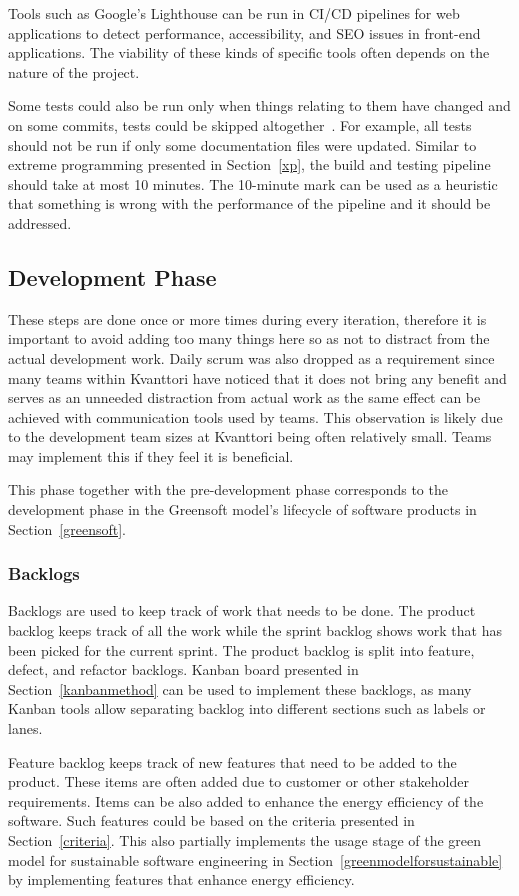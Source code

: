Tools such as Google's Lighthouse can be run in CI/CD pipelines for web applications to detect performance, accessibility, and SEO issues in front-end applications. The viability of these kinds of specific tools often depends on the nature of the project.

Some tests could also be run only when things relating to them have changed and on some commits, tests could be skipped altogether~\cite{skippedcommits}. For example, all tests should not be run if only some documentation files were updated. Similar to extreme programming presented in Section~\ref{xp}, the build and testing pipeline should take at most 10 minutes. The 10-minute mark can be used as a heuristic that something is wrong with the performance of the pipeline and it should be addressed.

\subsection{Development Phase}
These steps are done once or more times during every iteration, therefore it is important to avoid adding too many things here so as not to distract from the actual development work. Daily scrum was also dropped as a requirement since many teams within Kvanttori have noticed that it does not bring any benefit and serves as an unneeded distraction from actual work as the same effect can be achieved with communication tools used by teams. This observation is likely due to the development team sizes at Kvanttori being often relatively small. Teams may implement this if they feel it is beneficial.

This phase together with the pre-development phase corresponds to the development phase in the Greensoft model's lifecycle of software products in Section~\ref{greensoft}.

\subsubsection{Backlogs}
Backlogs are used to keep track of work that needs to be done. The product backlog keeps track of all the work while the sprint backlog shows work that has been picked for the current sprint. The product backlog is split into feature, defect, and refactor backlogs. Kanban board presented in Section~\ref{kanbanmethod} can be used to implement these backlogs, as many Kanban tools allow separating backlog into different sections such as labels or lanes.

Feature backlog keeps track of new features that need to be added to the product. These items are often added due to customer or other stakeholder requirements. Items can be also added to enhance the energy efficiency of the software. Such features could be based on the criteria presented in Section~\ref{criteria}. This also partially implements the usage stage of the green model for sustainable software engineering in Section~\ref{greenmodelforsustainable} by implementing features that enhance energy efficiency.

